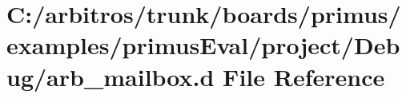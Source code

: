 \hypertarget{boards_2primus_2examples_2primus_eval_2project_2_debug_2arb__mailbox_8d}{\section{C\-:/arbitros/trunk/boards/primus/examples/primus\-Eval/project/\-Debug/arb\-\_\-mailbox.d File Reference}
\label{boards_2primus_2examples_2primus_eval_2project_2_debug_2arb__mailbox_8d}
}
